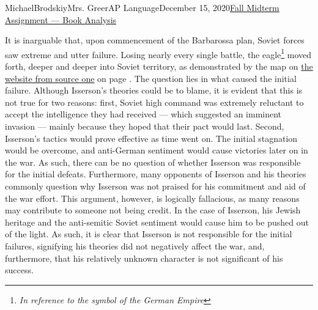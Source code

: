 \documentclass[12pt,letterpaper]{article}
\begin{document}
\begin{mla}{Michael}{Brodskiy}{Mrs. Greer}{AP Language}{December 15, 2020}{\underline{Fall Midterm Assignment — Book Analysis}}
  \begin{justify}
    \vspace{-12pt}\quad It is inarguable that, upon commencement of the Barbarossa plan, Soviet forces saw extreme and utter failure. Losing nearly every single battle, the eagle\footnote{\textit{In reference to the symbol of the German Empire}} moved forth, deeper and deeper into Soviet territory, as demonstrated by the map on \href{English.Pobediteli.ru}{the website from source one} on page \pageref{LastPage}.  The question lies in what caused the initial failure. Although Isserson's theories could be to blame, it is evident that this is not true for two reasons: first, Soviet high command was extremely reluctant to accept the intelligence they had received — which suggested an imminent invasion — mainly because they hoped that their pact would last. Second, Isserson's tactics would prove effective as time went on. The initial stagnation would be overcome, and anti-German sentiment would cause victories later on in the war. As such, there can be no question of whether Isserson was responsible for the initial defeats. Furthermore, many opponents of Isserson and his theories commonly question why Isserson was not praised for his commitment and aid of the war effort. This argument, however, is logically fallacious, as many reasons may contribute to someone not being credit. In the case of Isserson, his Jewish heritage and the anti-semitic Soviet sentiment would cause him to be pushed out of the light. As such, it is clear that Isserson is not responsible for the initial failures, signifying his theories did not negatively affect the war, and, furthermore, that his relatively unknown character is not significant of his success.
  \end{justify}


\end{mla}
\end{document}

